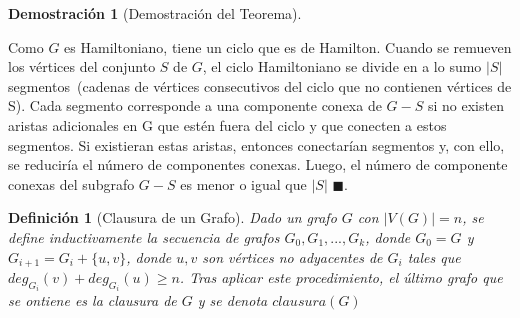 \documentclass[a4paper,1pt]{report}
\newtheorem*{dem}{Demostración}
\newtheorem*{dfn}{Definición}
\begin{document}
   \begin{dem}[Demostración del Teorema]\end{dem}

    Como $G$ es Hamiltoniano, tiene un ciclo que es de Hamilton.  
    Cuando se remueven los vértices del conjunto $S$ de $G$, el ciclo Hamiltoniano se divide en a lo sumo $|S|$ segmentos~(cadenas de vértices consecutivos del ciclo que no contienen vértices de S). 
    Cada segmento corresponde a una componente conexa de $G-S$ si no existen aristas adicionales en G que estén fuera del ciclo y que conecten a estos segmentos. Si existieran estas aristas, entonces conectarían segmentos y, con ello, se reduciría el número de componentes conexas. 
    Luego, el número de componente conexas del subgrafo $G - S$ es menor o igual que  $|S|$ $\blacksquare$.
   


\begin{dfn}[Clausura de un Grafo]
    Dado un grafo $G$ con $|V(G)| = n$, se define inductivamente la secuencia de grafos $G_0, G_1,..., G_k$, donde $G_0 = G$ y $G_{i+1} = G_i + \{u,v\}$, donde $u,v$ son v\'ertices no adyacentes de $G_i$ tales que $deg_{G_i}(v) + deg_{G_i}(u) \geq n$. Tras aplicar este procedimiento, el \'ultimo grafo que se ontiene es la clausura de $G$ y se denota $clausura(G)$ 
\end{dfn}
\end{document}
